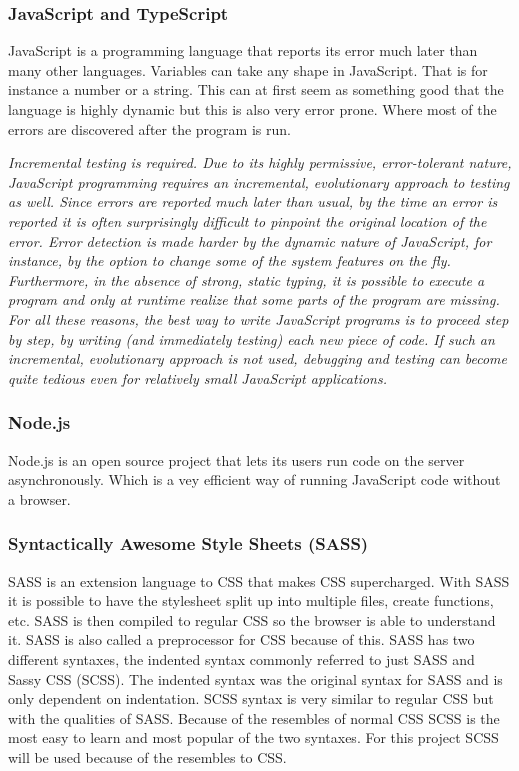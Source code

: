 \subsubsection{JavaScript and TypeScript}%
\label{ssub:JavaScript and TypeScript}

JavaScript is a programming language that reports its error much later than many other languages. Variables can take any shape in JavaScript. That is for instance a number or a string. This can at first seem as something good that the language is highly dynamic but this is also very error prone. Where most of the errors are discovered after the program is run. 

\textit{Incremental testing is required. Due to its highly permissive, error-tolerant nature, JavaScript programming requires an incremental, evolutionary approach to testing as well. Since errors are reported much later than usual, by the time an error is reported it is often surprisingly difficult to pinpoint the original location of the error. Error detection is made harder by the dynamic nature of JavaScript, for instance, by the option to change some of the system features on the fly. Furthermore, in the absence of strong, static typing, it is possible to execute a program and only at runtime realize that some parts of the program are missing. For all these reasons, the best way to write JavaScript programs is to proceed step by step, by writing (and immediately testing) each new piece of code. If such an incremental, evolutionary approach is not used, debugging and testing can become quite tedious even for relatively small JavaScript applications.} \cite{taivalsaari2008web} 


\subsubsection{Node.js}%
\label{ssub:Node}
Node.js is an open source project that lets its users run code on the server asynchronously. Which is a vey efficient way of running JavaScript code without a browser. 

\subsubsection{Syntactically Awesome Style Sheets (SASS)}%
\label{sub:sass}
SASS is an extension language to CSS that makes CSS supercharged. With SASS it is possible to have the stylesheet split up into multiple files, create functions, etc. SASS is then compiled to regular CSS so the browser is able to understand it. SASS is also called a preprocessor for CSS because of this.  SASS has two different syntaxes, the indented syntax commonly referred to just SASS and Sassy CSS (SCSS). The indented syntax was the original syntax for SASS and is only dependent on indentation. SCSS syntax is very similar to regular CSS but with the qualities of SASS. Because of the resembles of normal CSS SCSS is the most easy to learn and most popular of the two syntaxes. For this project SCSS will be used because of the resembles to CSS.

